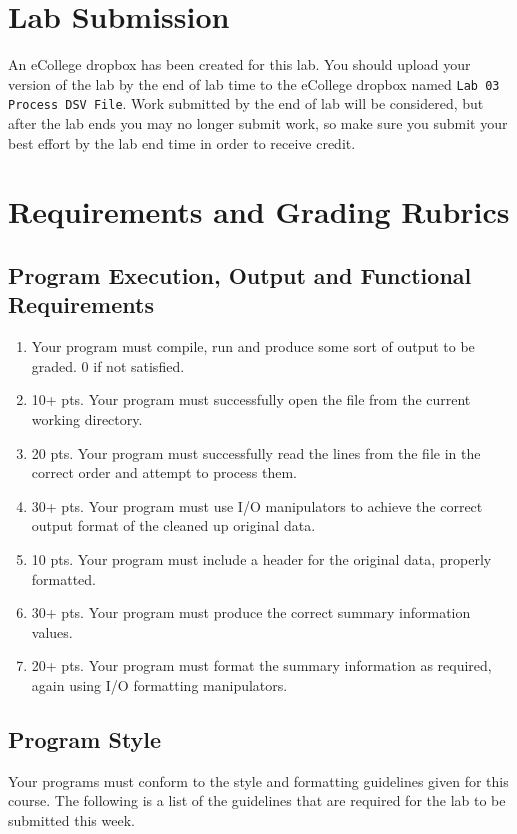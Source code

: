 \documentclass[11pt]{article}
\begin{document}
\section*{Lab Submission}
\label{sec-4}

An eCollege dropbox has been created for this lab.  You should
upload your version of the lab by the end of lab time to the eCollege
dropbox named \verb~Lab 03 Process DSV File~.  Work submitted by the end
of lab will be considered, but after the lab ends you may no longer
submit work, so make sure you submit your best effort by the lab end
time in order to receive credit.
\section*{Requirements and Grading Rubrics}
\label{sec-5}

\subsection*{Program Execution, Output and Functional Requirements}
\label{sec-5-1}

\begin{enumerate}
\item Your program must compile, run and produce some sort of output to be
graded. 0 if not satisfied.
\item 10+ pts. Your program must successfully open the file from the current
working directory.
\item 20 pts. Your program must successfully read the lines from the file in the
correct order and attempt to process them.
\item 30+ pts. Your program must use I/O manipulators to achieve the correct output
format of the cleaned up original data.
\item 10 pts. Your program must include a header for the original data, properly
formatted.
\item 30+ pts. Your program must produce the correct summary information values.
\item 20+ pts. Your program must format the summary information as required, again
using I/O formatting manipulators.
\end{enumerate}

\subsection*{Program Style}
\label{sec-5-2}

Your programs must conform to the style and formatting guidelines given for this course.
The following is a list of the guidelines that are required for the lab to be submitted
this week.
\end{document}
